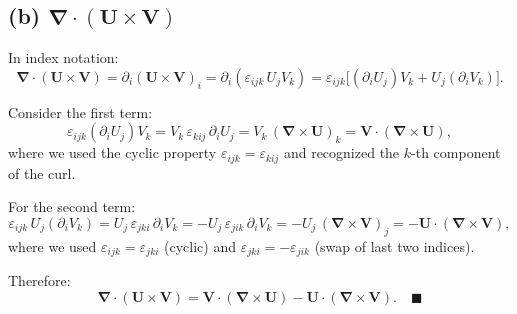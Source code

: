 \documentclass[12pt]{article}
\newcommand{\vect}[1]{\mathbf{#1}}
\newcommand{\grad}{\boldsymbol{\nabla}}
\begin{document}
\subsection*{(b) $\grad\cdot(\vect{U}\times\vect{V})$}

In index notation:
\[
\grad\cdot(\vect{U}\times\vect{V}) = \partial_i(\vect{U}\times\vect{V})_i = \partial_i(\varepsilon_{ijk}\,U_j V_k) = \varepsilon_{ijk}\bigl[(\partial_i U_j)V_k + U_j(\partial_i V_k)\bigr].
\]

Consider the first term:
\[
\varepsilon_{ijk}(\partial_i U_j)V_k = V_k\,\varepsilon_{kij}\,\partial_i U_j = V_k\,(\grad\times\vect{U})_k = \vect{V}\cdot(\grad\times\vect{U}),
\]
where we used the cyclic property $\varepsilon_{ijk} = \varepsilon_{kij}$ and recognized the $k$-th component of the curl.

For the second term:
\[
\varepsilon_{ijk}\,U_j(\partial_i V_k) = U_j\,\varepsilon_{jki}\,\partial_i V_k = -U_j\,\varepsilon_{jik}\,\partial_i V_k = -U_j\,(\grad\times\vect{V})_j = -\vect{U}\cdot(\grad\times\vect{V}),
\]
where we used $\varepsilon_{ijk} = \varepsilon_{jki}$ (cyclic) and $\varepsilon_{jki} = -\varepsilon_{jik}$ (swap of last two indices).

Therefore:
\[
\boxed{\grad\cdot(\vect{U}\times\vect{V}) = \vect{V}\cdot(\grad\times\vect{U}) - \vect{U}\cdot(\grad\times\vect{V})}. \quad \blacksquare
\]
\end{document}
